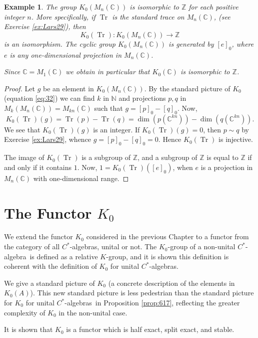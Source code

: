 \documentclass{book}
\newtheorem{example}[definition]{Example}
\def\cstar{\(C^*\)-algebra}
\def\cstars{\(C^*\)-algebras}
\begin{document}
\begin{example}\label{ex:Lars332}
  The group \(K_0(M_n(\mathbb{C}))\) is isomorphic to \(\mathbb{Z}\) for each positive integer \(n\).
  More specifically, if \(\operatorname{Tr}\) is the standard trace on \(M_n(\mathbb{C})\), (see Exercise \ref{ex:Lars29}), then
  \[
    K_0(\operatorname{Tr}):K_0(M_n(\mathbb{C}))\to\mathbb{Z}
  \]
  is an isomorphism. The cyclic group \(K_0(M_n(\mathbb{C}))\) is generated by \({[e]}_0\),
  where \(e\) is any one-dimensional projection in \(M_n(\mathbb{C})\).\par
  Since \(\mathbb{C}=M_1(\mathbb{C})\) we obtain in particular that \(K_0(\mathbb{C})\) is isomorphic to \(\mathbb{Z}\).
\end{example} 
\begin{proof}
  Let \(g\) be an element in \(K_0(M_n(\mathbb{C}))\). By the standard picture of \(K_0\) (equation \ref{eq:32})
  we can find \(k\) in \(\mathbb{N}\) and projections \(p,q\) in \(M_k(M_n(\mathbb{C}))=M_{kn}(\mathbb{C})\) such that \(g={[p]}_0-{[q]}_0\). Now,
  \[
    K_0(\operatorname{Tr})(g)=\operatorname{Tr}(p)-\operatorname{Tr}(q)=\dim(p(\mathbb{C}^{kn}))-\dim(q(\mathbb{C}^{kn})).
  \]
  We see that \(K_0(\operatorname{Tr})(g)\) is an integer. If \(K_0(\operatorname{Tr})(g)=0\),
  then \(p\sim q\) by Exercise \ref{ex:Lars29}, whence \(g={[p]}_0-{[q]}_0=0\). Hence \(K_0(\operatorname{Tr})\) is injective.\par
  The image of \(K_0(\operatorname{Tr})\) is a subgroup of \(\mathbb{Z}\), and a subgroup of \(\mathbb{Z}\) is equal to \(\mathbb{Z}\) if and only if it contains \(1\).
  Now, \(1=K_0(\operatorname{Tr})({[e]}_0)\), when \(e\) is a projection in \(M_n(\mathbb{C})\) with one-dimensional range.
\end{proof}

\chapter{The Functor \texorpdfstring{\(K_0\)}{K0}}\label{chap:K0Functor}
We extend the functor \(K_0\) considered in the previous Chapter to a functor from the
category of all \cstars, unital or not. The \(K_0\)-group of a non-unital \cstar\
is defined as a relative \(K\)-group, and it is shown this definition is
coherent with the definition of \(K_0\) for unital \cstars.\par
We give a standard picture of \(K_0\) (a concrete description of the elements
  in \(K_0(A)\)). This new standard picture is less pedestrian than the standard
picture for \(K_0\) for unital \cstars\ in Proposition \ref{prop:617}, reflecting
the greater complexity of \(K_0\) in the non-unital case.\par
It is shown that \(K_0\) is a functor which is half exact, split exact, and stable.
\end{document}
